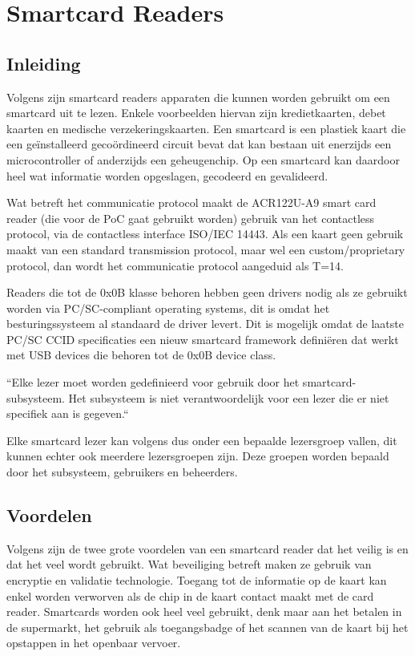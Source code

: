 \section{Smartcard Readers}
\subsection{Inleiding}
Volgens \textcite{OnyaitOdekeCardReader} zijn smartcard readers apparaten die kunnen worden gebruikt om een smartcard uit te lezen. Enkele voorbeelden hiervan zijn kredietkaarten, debet kaarten en medische verzekeringskaarten. Een smartcard is een plastiek kaart die een geïnstalleerd gecoördineerd circuit bevat dat kan bestaan uit enerzijds een microcontroller of anderzijds een geheugenchip. Op een smartcard kan daardoor heel wat informatie worden opgeslagen, gecodeerd en gevalideerd.

Wat betreft het communicatie protocol maakt de ACR122U-A9 smart card reader (die voor de PoC gaat gebruikt worden) gebruik van het contactless protocol, via de contactless interface ISO/IEC 14443. Als een kaart geen gebruik maakt van een standard transmission protocol, maar wel een custom/proprietary protocol, dan wordt het communicatie protocol aangeduid als T=14.

Readers die tot de 0x0B klasse behoren hebben geen drivers nodig als ze gebruikt worden via PC/SC-compliant operating systems, dit is omdat het besturingssysteem al standaard de driver levert. Dit is mogelijk omdat de laatste PC/SC CCID specificaties een nieuw smartcard framework definiëren dat werkt met USB devices die behoren tot de 0x0B device class.


``Elke lezer moet worden gedefinieerd voor gebruik door het smartcard-subsysteem. Het subsysteem is niet verantwoordelijk voor een lezer die er niet specifiek aan is gegeven.``\autocite{MicrosoftSmartCardReaders}

Elke smartcard lezer kan volgens \textcite{MicrosoftSmartCardReaders} dus onder een bepaalde lezersgroep vallen, dit kunnen echter ook meerdere lezersgroepen zijn. Deze groepen worden bepaald door het subsysteem, gebruikers en beheerders.

\subsection{Voordelen}
Volgens \textcite{OnyaitOdekeCardReader} zijn de twee grote voordelen van een smartcard reader dat het veilig is en dat het veel wordt gebruikt. Wat beveiliging betreft maken ze gebruik van encryptie en validatie technologie. Toegang tot de informatie op de kaart kan enkel worden verworven als de chip in de kaart contact maakt met de card reader. Smartcards worden ook heel veel gebruikt, denk maar aan het betalen in de supermarkt, het gebruik als toegangsbadge of het scannen van de kaart bij het opstappen in het openbaar vervoer.

